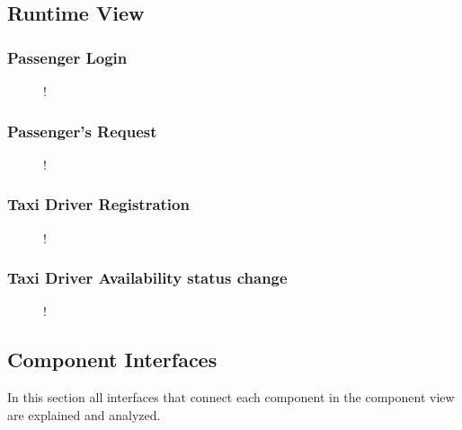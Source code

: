 \subsection{Runtime View}
\subsubsection{Passenger Login}
\begin{figure}[H]
	\small
	\centering
	\resizebox{6in}
	{!}{}
	\end{figure}
\subsubsection{Passenger's Request}
\begin{figure}[H]
	\small
	\centering
	\resizebox{6in}
	{!}{}
\end{figure}
\subsubsection{Taxi Driver Registration}
\begin{figure}[H]
	\small
	\centering
	\resizebox{6in}
	{!}{}
\end{figure}
\subsubsection{Taxi Driver Availability status change}
\begin{figure}[H]
	\small
	\centering
	\resizebox{6in}
	{!}{}
\end{figure}
\subsection{Component Interfaces}
In this section all interfaces that connect each component in the component view are explained and analyzed.
